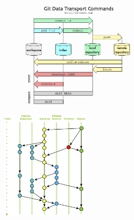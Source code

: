 \documentclass[aspectratio=169]{beamer}
\begin{document}
\begin{frame}
\begin{figure}[ht]
\centering
\includegraphics[height=150pt]{pictures/git.jpg}
\end{figure}
\end{frame}






\begin{frame}
\begin{figure}[ht]
\centering
\includegraphics[height=150pt]{pictures/branches.jpg}
\end{figure}
\end{frame}
\end{document}
